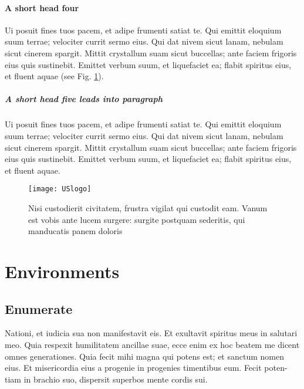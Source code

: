 \documentclass[numbers,compress]{vmsta2}
\theoremstyle{definition}
\begin{document}
\paragraph{A short head four}
Ui posuit fines tuos pacem,
et adipe frumenti satiat te. Qui emittit eloquium suum terrae;
velociter currit sermo eius.  Qui dat nivem sicut lanam, nebulam
sicut cinerem spargit. Mittit crystallum suam sicut buccellas; ante
faciem frigoris eius quis sustinebit. Emittet verbum suum, et
liquefaciet ea; flabit spiritus eius, et fluent aquae (see Fig. \ref{f1}).

\subparagraph{A short head five leads into paragraph} Ui posuit fines tuos pacem,
et adipe frumenti satiat te. Qui emittit eloquium suum terrae;
velociter currit sermo eius.  Qui dat nivem sicut lanam, nebulam
sicut cinerem spargit. Mittit crystallum suam sicut buccellas; ante
faciem frigoris eius quis sustinebit. Emittet verbum suum, et
liquefaciet ea; flabit spiritus eius, et fluent aquae.


\begin{figure}[t]
\texttt{[image: USlogo]}%
\caption{%
Nisi custodierit civitatem, frustra vigilat qui custodit eam. Vanum
est vobis ante lucem surgere: surgite postquam sederitis, qui
manducatis panem doloris}\label{f1} %
\end{figure}


\section{Environments}

\subsection{Enumerate}

Nationi, et iudicia sua non manifestavit eis. Et exultavit spiritus meus
in salutari meo.  Quia respexit humilitatem ancillae suae, ecce enim ex
hoc beatem me dicent omnes generationes. Quia fecit mihi magna qui potens
est; et sanctum nomen eius. Et misericordia eius a progenie in progenies
timentibus eum. Fecit poten-tiam in brachio suo, dispersit superbos mente
cordis sui.
\end{document}
